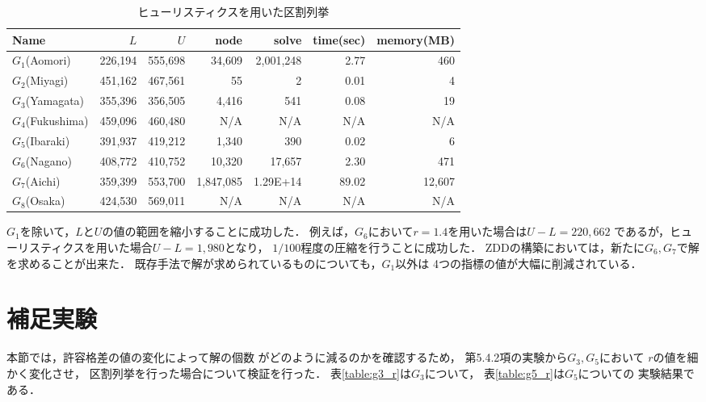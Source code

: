 \begin{table}[htbp]
  \caption{ヒューリスティクスを用いた区割列挙}
  \label{out_h}
  \centering
  \begin{tabular}{l||r|r||r|r|r|r}
    \hline
    Name & $L$ & $U$ & node & solve & time(sec) & memory(MB) \\
    \hline \hline
    $G_1$(Aomori) & 226{,}194 & 555{,}698 & 34{,}609 & 2{,}001{,}248 & 2.77 & 460 \\
    $G_2$(Miyagi) & 451{,}162 & 467{,}561 & 55 & 2 & 0.01 & 4 \\
    $G_3$(Yamagata) & 355{,}396 & 356{,}505 & 4{,}416 & 541 & 0.08 & 19 \\
    $G_4$(Fukushima) & 459{,}096 & 460{,}480 & N/A & N/A & N/A & N/A \\
    $G_5$(Ibaraki) & 391{,}937 & 419{,}212 & 1{,}340 & 390 & 0.02 & 6 \\
    $G_6$(Nagano) & 408{,}772 & 410{,}752 & 10{,}320 & 17{,}657 & 2.30 & 471 \\
    $G_7$(Aichi) & 359{,}399 & 553{,}700 & 1{,}847{,}085 & 1.29E+14 & 89.02 & 12{,}607 \\
    $G_8$(Osaka) & 424{,}530 & 569{,}011 & N/A & N/A & N/A & N/A \\
    \hline
  \end{tabular}
\end{table}

$G_1$を除いて，$L$と$U$の値の範囲を縮小することに成功した．
例えば，$G_6$において$r=1.4$を用いた場合は$U-L=220{,}662$
であるが，ヒューリスティクスを用いた場合$U-L=1{,}980$となり，
$1/100$程度の圧縮を行うことに成功した．
ZDDの構築においては，新たに$G_6, G_7$で解を求めることが出来た．
既存手法で解が求められているものについても，$G_1$以外は
4つの指標の値が大幅に削減されている．

\section{補足実験}

本節では，許容格差の値の変化によって解の個数
がどのように減るのかを確認するため，
第5.4.2項の実験から$G_3, G_5$において
$r$の値を細かく変化させ，
区割列挙を行った場合について検証を行った．
表\ref{table:g3_r}は$G_3$について，
表\ref{table:g5_r}は$G_5$についての
実験結果である．

